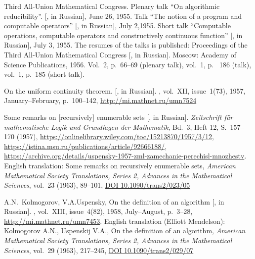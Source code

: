 \documentclass[12pt]{article}
\theoremstyle{remark}
\newcommand{\bibquote}[1]{}
\newcommand{\nb}[1]{{\color{red}}}
\begin{document}
\begin{thebibliography}{99}
Third All-Union Mathematical Congress. Plenary talk ``On algorithmic reducibility''. [, in Russian], June 26, 1955.  Talk ``The notion of a program and computable operators'' [, in Russian], July 2,1955. Short talk ``Computable operations, computable operators and constructively continuous function'' [, in Russian], July 3, 1955. The resumes of the talks is published: Proceedings of the Third All-Union Mathematical Congress [\emph{}, in Russian]. Moscow: Academy of Science Publications, 1956. Vol.~2, p.~66--69 (plenary talk), vol.~1, p.~ 186 (talk), vol.~1, p.~185 (short talk).

\nb{no scan?}

On the uniform continuity theorem. [, in Russian]. \emph{}, vol.~XII, issue~1(73), 1957, January--February, p.~100--142, \url{http://mi.mathnet.ru/umn7524}

Some remarks on [recursively] enumerable sets [, in Russian]. \emph{Zeitschrift f\"ur mathematische Logik und Grundlagen der Mathematik}, Bd.~3, Heft 12, S.~157--170 (1957), \url{https://onlinelibrary.wiley.com/toc/15213870/1957/3/12}, \url{https://istina.msu.ru/publications/article/92666188/}, \url{https://archive.org/details/uspensky-1957-zml-zamechanie-perechisl-mnozhestv}. English translation: Some remarks on recursively enumerable sets, \emph{American Mathematical Society Translations, Series 2, Advances in the Mathematical Sciences}, vol.~23 (1963), 89--101, \url{DOI 10.1090/trans2/023/05}

\bibquote{\nb{\rus{Система всех бесконечных линейных перечислимых множеств не допускает вычислимой нумерации, множество нижних точек перечислимого множества может не быть перечислимым, классификация перечислимых множеств, гипериммунные множества как множества, у которых прямой пересчёт не мажорируется вычислимой функцией.}}}

A.N.~Kolmogorov, V.A.Uspensky, On the definition of an algorithm [, in Russian]. \emph{}, vol.~XIII, issue~4(82), 1958, July--August, p.~3--28, \url{http://mi.mathnet.ru/umn7453}. English translation (Elliott Mendelson): Kolmogorov A.N., Uspenskij V.A., On the definition of an algorithm,  \emph{American Mathematical Society Translations, Series 2, Advances in the Mathematical Sciences}, vol.~29 (1963), 217--245, \url{DOI 10.1090/trans2/029/07}


\end{thebibliography}
\end{document}
